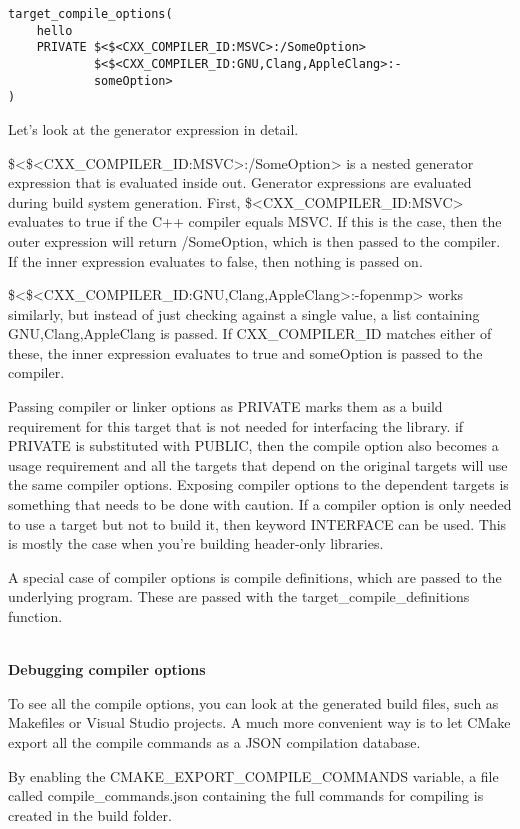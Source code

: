 \begin{lstlisting}[style=styleCMake]
target_compile_options(
	hello
	PRIVATE $<$<CXX_COMPILER_ID:MSVC>:/SomeOption>
			$<$<CXX_COMPILER_ID:GNU,Clang,AppleClang>:-
			someOption>
)
\end{lstlisting}

Let's look at the generator expression in detail.

\$<\$<CXX\_COMPILER\_ID:MSVC>:/SomeOption> is a nested generator expression that is evaluated inside out. Generator expressions are evaluated during build system generation. First, \$<CXX\_COMPILER\_ID:MSVC> evaluates to true if the C++ compiler equals MSVC. If this is the case, then the outer expression will return /SomeOption, which is then passed to the compiler. If the inner expression evaluates to false, then nothing is passed on.

\$<\$<CXX\_COMPILER\_ID:GNU,Clang,AppleClang>:-fopenmp> works similarly, but instead of just checking against a single value, a list containing GNU,Clang,AppleClang is passed. If CXX\_COMPILER\_ID matches either of these, the inner expression evaluates to true and someOption is passed to the compiler.

Passing compiler or linker options as PRIVATE marks them as a build requirement for this target that is not needed for interfacing the library. if PRIVATE is substituted with PUBLIC, then the compile option also becomes a usage requirement and all the targets that depend on the original targets will use the same compiler options. Exposing compiler options to the dependent targets is something that needs to be done with caution. If a compiler option is only needed to use a target but not to build it, then keyword INTERFACE can be used. This is mostly the case when you're building header-only libraries.

A special case of compiler options is compile definitions, which are passed to the underlying program. These are passed with the target\_compile\_definitions function.

\hspace*{\fill} \\ %
\noindent
\textbf{Debugging compiler options}

To see all the compile options, you can look at the generated build files, such as Makefiles or Visual Studio projects. A much more convenient way is to let CMake export all the compile commands as a JSON compilation database.

By enabling the CMAKE\_EXPORT\_COMPILE\_COMMANDS variable, a file called compile\_commands.json containing the full commands for compiling is created in the build folder.

